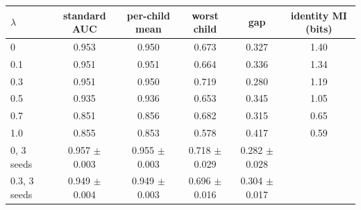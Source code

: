 \begin{tabular}{lccccc}
\toprule
$\lambda$ & standard AUC & per-child mean & worst child & gap & identity MI (bits) \\
\midrule
0 & 0.953 & 0.950 & 0.673 & 0.327 & 1.40 \\
0.1 & 0.951 & 0.951 & 0.664 & 0.336 & 1.34 \\
0.3 & 0.951 & 0.950 & 0.719 & 0.280 & 1.19 \\
0.5 & 0.935 & 0.936 & 0.653 & 0.345 & 1.05 \\
0.7 & 0.851 & 0.856 & 0.682 & 0.315 & 0.65 \\
1.0 & 0.855 & 0.853 & 0.578 & 0.417 & 0.59 \\
\midrule
0, 3 seeds & 0.957 $\pm$ 0.003 & 0.955 $\pm$ 0.003 & 0.718 $\pm$ 0.029 & 0.282 $\pm$ 0.028 & \\
0.3, 3 seeds & 0.949 $\pm$ 0.004 & 0.949 $\pm$ 0.003 & 0.696 $\pm$ 0.016 & 0.304 $\pm$ 0.017 & \\
\bottomrule
\end{tabular}
